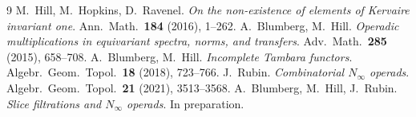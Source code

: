 \begin{thebibliography}{9}
 M.~Hill, M.~Hopkins, D.~Ravenel.  \emph{On the non-existence of elements of Kervaire invariant one}.  Ann.\ Math.\ \textbf{184} (2016), 1--262.
 A.~Blumberg, M.~Hill.  \emph{Operadic multiplications in equivariant spectra, norms, and transfers}.  Adv.\ Math.\ \textbf{285} (2015), 658--708.
 A.~Blumberg, M.~Hill.  \emph{Incomplete Tambara functors}.  Algebr.\ Geom.\ Topol.\ \textbf{18} (2018), 723--766.
 J.~Rubin.  \emph{Combinatorial $N_\infty$ operads}.  Algebr.\ Geom.\ Topol.\ \textbf{21} (2021), 3513--3568.
 A.~Blumberg, M.~Hill, J.~Rubin.  \emph{Slice filtrations and $N_\infty$ operads}.  In preparation.
\end{thebibliography}


